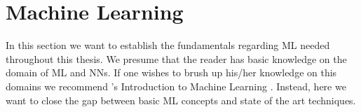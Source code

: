 \section{Machine Learning}
\label{chp:fundamentals:sec:machine_learning}
In this section we want to establish the fundamentals regarding \ac{ML} needed throughout this thesis.
We presume that the reader has basic knowledge on the domain of \ac{ML} and \acp{NN}.
If one wishes to brush up his/her knowledge on this domains we recommend \citeauthor{Alpaydin:2020}'s Introduction to Machine Learning \parencite{Alpaydin:2020}.
Instead, here we want to close the gap between basic \ac{ML} concepts and state of the art techniques.





